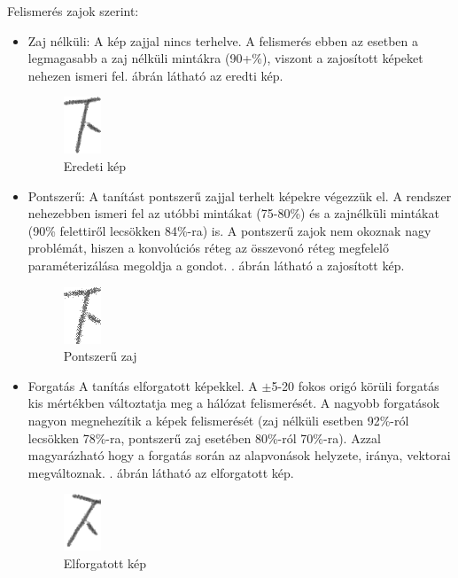 Felismerés zajok szerint:
\begin{itemize}
\item Zaj nélküli: A kép zajjal nincs terhelve. A felismerés ebben az esetben a legmagasabb a zaj nélküli mintákra (90+\%), viszont a zajosított képeket nehezen ismeri fel. ábrán látható az eredti kép.

\begin{figure}[h!]
	\centering
	\includegraphics[scale=1.0]{images/original}
	\caption{Eredeti kép}
	\label{fig:original}
\end{figure}

\item Pontszerű: A tanítást pontszerű zajjal terhelt képekre végezzük el. A rendszer nehezebben ismeri fel az utóbbi mintákat (75-80\%) és a zajnélküli mintákat (90\% felettiről lecsökken 84\%-ra) is. A pontszerű zajok nem okoznak nagy problémát, hiszen a konvolúciós réteg az összevonó réteg megfelelő paraméterizálása megoldja a gondot. . ábrán látható a zajosított kép.

\begin{figure}[h!]
	\centering
	\includegraphics[scale=1.0]{images/noise}
	\caption{Pontszerű zaj}
	\label{fig:noise}
\end{figure}

\item Forgatás A tanítás elforgatott képekkel. A $\pm$5-20 fokos origó körüli forgatás kis mértékben változtatja meg a hálózat felismerését. A nagyobb forgatások nagyon megnehezítik a képek felismerését (zaj nélküli esetben 92\%-ról lecsökken 78\%-ra, pontszerű zaj esetében 80\%-ról 70\%-ra). Azzal magyarázható hogy a forgatás során az alapvonások helyzete, iránya, vektorai megváltoznak. . ábrán látható az elforgatott kép.

\begin{figure}[h!]
	\centering
	\includegraphics[scale=1.0]{images/rotate}
	\caption{Elforgatott kép}
	\label{fig:rotated}
\end{figure}
\newpage


\end{itemize}
